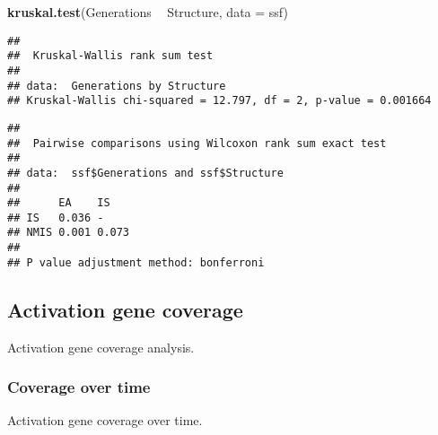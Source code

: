 \documentclass[]{book}
\newenvironment{Shaded}{\begin{snugshade}}{\end{snugshade}}
\newcommand{\DataTypeTok}[1]{\textcolor[rgb]{0.13,0.29,0.53}{#1}}
\newcommand{\KeywordTok}[1]{\textcolor[rgb]{0.13,0.29,0.53}{\textbf{#1}}}
\newcommand{\NormalTok}[1]{#1}
\newcommand{\OperatorTok}[1]{\textcolor[rgb]{0.81,0.36,0.00}{\textbf{#1}}}
\newcommand{\OtherTok}[1]{\textcolor[rgb]{0.56,0.35,0.01}{#1}}
\newcommand{\StringTok}[1]{\textcolor[rgb]{0.31,0.60,0.02}{#1}}
\begin{document}
\begin{Shaded}
\begin{Highlighting}[]
\KeywordTok{kruskal.test}\NormalTok{(Generations }\OperatorTok{~}\StringTok{ }\NormalTok{Structure, }\DataTypeTok{data =}\NormalTok{ ssf)}
\end{Highlighting}
\end{Shaded}

\begin{verbatim}
## 
##  Kruskal-Wallis rank sum test
## 
## data:  Generations by Structure
## Kruskal-Wallis chi-squared = 12.797, df = 2, p-value = 0.001664
\end{verbatim}

\begin{Shaded}
\end{Shaded}

\begin{verbatim}
## 
##  Pairwise comparisons using Wilcoxon rank sum exact test 
## 
## data:  ssf$Generations and ssf$Structure 
## 
##      EA    IS   
## IS   0.036 -    
## NMIS 0.001 0.073
## 
## P value adjustment method: bonferroni
\end{verbatim}

\hypertarget{activation-gene-coverage-4}{%
\subsection{Activation gene coverage}\label{activation-gene-coverage-4}}

Activation gene coverage analysis.

\hypertarget{coverage-over-time-7}{%
\subsubsection{Coverage over time}\label{coverage-over-time-7}}

Activation gene coverage over time.
\end{document}
